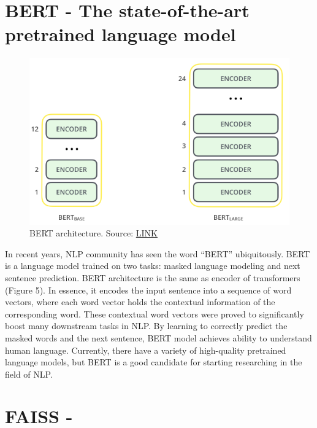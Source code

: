\documentclass[12pt, sort&compress]{report}
\begin{document}
\section{BERT - The state-of-the-art pretrained language model}
\begin{figure}[!htbp]
	\centering
	\includegraphics[scale=.6]{images/bert.png}
	\caption{BERT architecture. Source: \href{http://jalammar.github.io/illustrated-bert/}{LINK}}
	\label{fig:2:05}
\end{figure}
\par In recent years, NLP community has seen the word “BERT” ubiquitously. BERT is a language model trained on two tasks: masked language modeling and next sentence prediction. BERT architecture is the same as encoder of transformers (Figure 5). In essence, it encodes the input sentence into a sequence of word vectors, where each word vector holds the contextual information of the corresponding word. These contextual word vectors were proved to significantly boost many downstream tasks in NLP. By learning to correctly predict the masked words and the next sentence, BERT model achieves ability to understand human language. Currently, there have a variety of high-quality pretrained language models, but BERT is a good candidate for starting researching in the field of NLP.
\section{FAISS - }
\newpage
\end{document}
